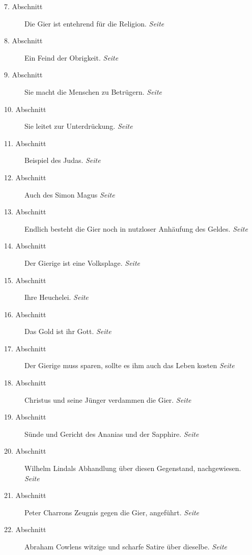 \begin{description}
\item[7. Abschnitt] Die Gier ist entehrend für die Religion.
\dotfill \textit{Seite~\pageref{kap13_ab7}}\\
\item[8. Abschnitt] Ein Feind der Obrigkeit.
\dotfill \textit{Seite~\pageref{kap13_ab8}}\\
\item[9. Abschnitt] Sie macht die Menschen zu Betrügern.
\dotfill \textit{Seite~\pageref{kap13_ab9}}\\
\item[10. Abschnitt] Sie leitet zur Unterdrückung.
\dotfill \textit{Seite~\pageref{kap13_ab10}}\\
\item[11. Abschnitt] Beispiel des Judas.
\dotfill \textit{Seite~\pageref{kap13_ab11}}\\
\item[12. Abschnitt] Auch des Simon Magus
\dotfill \textit{Seite~\pageref{kap13_ab12}}\\
\item[13. Abschnitt] Endlich besteht die Gier noch in nutzloser Anhäufung des
Geldes.
\dotfill \textit{Seite~\pageref{kap13_ab13}}\\
\item[14. Abschnitt] Der Gierige ist eine Volksplage.
\dotfill \textit{Seite~\pageref{kap13_ab14}}\\
\item[15. Abschnitt] Ihre Heuchelei.
\dotfill \textit{Seite~\pageref{kap13_ab15}}\\
\item[16. Abschnitt] Das Gold ist ihr Gott.
\dotfill \textit{Seite~\pageref{kap13_ab16}}\\
\item[17. Abschnitt] Der Gierige muss sparen, sollte es ihm auch das Leben
kosten
\dotfill \textit{Seite~\pageref{kap13_ab17}}\\
\item[18. Abschnitt] Christus und seine Jünger verdammen die Gier.
\dotfill \textit{Seite~\pageref{kap13_ab18}}\\
\item[19. Abschnitt] Sünde und Gericht des Ananias und der Sapphire.
\dotfill \textit{Seite~\pageref{kap13_ab19}}\\
\item[20. Abschnitt] Wilhelm Lindals Abhandlung über diesen Gegenstand,
nachgewiesen.
\dotfill \textit{Seite~\pageref{kap13_ab20}}\\
\item[21. Abschnitt] Peter Charrons Zeugnis gegen die Gier, angeführt.
\dotfill \textit{Seite~\pageref{kap13_ab21}}\\
\item[22. Abschnitt] Abraham Cowlens witzige und scharfe Satire über dieselbe.
\dotfill \textit{Seite~\pageref{kap13_ab22}}\\

\end{description}

